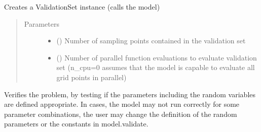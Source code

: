 \documentclass[letterpaper,10pt,english,openany,oneside]{sphinxmanual}
\begin{document}
\begin{fulllineitems}
\begin{sphinxVerbatim}[commandchars=\\\{\}]
\PYG{p}{[}\PYG{p}{]}  \PYG{p}{[} \PYG{p}{]}                           
   
\end{sphinxVerbatim}

\begin{fulllineitems}
\label{\detokenize{pygpc:pygpc.Problem.Problem.create_validation_set}}
Creates a ValidationSet instance (calls the model)
\begin{quote}\begin{description}
\item[{Parameters}] \leavevmode\begin{itemize}
\item {} 
 () \textendash{} Number of sampling points contained in the validation set

\item {} 
 () \textendash{} Number of parallel function evaluations to evaluate validation set (n\_cpu=0 assumes that the
model is capable to evaluate all grid points in parallel)

\end{itemize}

\end{description}\end{quote}

\end{fulllineitems}


\begin{fulllineitems}
\label{\detokenize{pygpc:pygpc.Problem.Problem.validate}}
Verifies the problem, by testing if the parameters including the random variables are defined appropriate.
In cases, the model may not run correctly for some parameter combinations, the user may change the definition
of the random parameters or the constants in model.validate.


\end{fulllineitems}
\end{fulllineitems}
\end{document}
